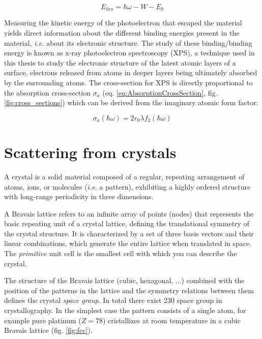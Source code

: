 \begin{equation}
    E_{kin} = \hbar\omega - W - E_b
\end{equation}

Measuring the kinetic energy of the photoelectron that escaped the material yields direct information about the different binding energies present in the material, \textit{i.e.} about its electronic structure.
The study of these binding/binding energy is known as x-ray photoelectron spectroscopy (XPS), a technique used in this thesis to study the electronic structure of the latest atomic layers of a surface, electrons released from atoms in deeper layers being ultimately absorbed by the surrounding atoms.
The cross-section for XPS is directly proportional to the absorption cross-section $\sigma_a$ (eq. \ref{eq:AbsorptionCrossSection}, fig. \ref{fig:cross_sections}) which can be derived from the imaginary atomic form factor:

\begin{equation}
    \label{eq:AbsorptionCrossSection}
    \sigma_a(\hbar\omega) = 2 r_0 \lambda f_2(\hbar\omega)
\end{equation}

\section{Scattering from crystals}

A crystal is a solid material composed of a regular, repeating arrangement of atoms, ions, or molecules (\textit{i.e.} a pattern), exhibiting a highly ordered structure with long-range periodicity in three dimensions.

A Bravais lattice refers to an infinite array of points (nodes) that represents the basic repeating unit of a crystal lattice, defining the translational symmetry of the crystal structure.
It is characterized by a set of three basis vectors and their linear combinations, which generate the entire lattice when translated in space.
The \textit{primitive} unit cell is the smallest cell with which you can describe the crystal.

The structure of the Bravais lattice (cubic, hexagonal, ...) combined with the position of the patterns in the lattice and the symmetry relations between them defines the crystal \textit{space group}.
In total there exist 230 space group in crystallography.
In the simplest case the pattern consists of a single atom, for example pure platinum ($Z=78$) cristallizes at room temperature in a cubic Bravais lattice (fig. \ref{fig:fcc}).

